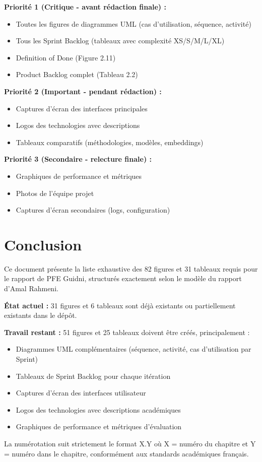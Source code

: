 \documentclass[12pt,a4paper]{article}
\begin{document}
\textbf{Priorité 1 (Critique - avant rédaction finale) :}
\begin{itemize}
    \item Toutes les figures de diagrammes UML (cas d'utilisation, séquence, activité)
    \item Tous les Sprint Backlog (tableaux avec complexité XS/S/M/L/XL)
    \item Definition of Done (Figure 2.11)
    \item Product Backlog complet (Tableau 2.2)
\end{itemize}

\textbf{Priorité 2 (Important - pendant rédaction) :}
\begin{itemize}
    \item Captures d'écran des interfaces principales
    \item Logos des technologies avec descriptions
    \item Tableaux comparatifs (méthodologies, modèles, embeddings)
\end{itemize}

\textbf{Priorité 3 (Secondaire - relecture finale) :}
\begin{itemize}
    \item Graphiques de performance et métriques
    \item Photos de l'équipe projet
    \item Captures d'écran secondaires (logs, configuration)
\end{itemize}


\section*{Conclusion}

Ce document présente la liste exhaustive des 82 figures et 31 tableaux requis pour le rapport de PFE Guidni, structurés exactement selon le modèle du rapport d'Amal Rahmeni. 

\textbf{État actuel :} 31 figures et 6 tableaux sont déjà existants ou partiellement existants dans le dépôt.

\textbf{Travail restant :} 51 figures et 25 tableaux doivent être créés, principalement :
\begin{itemize}
    \item Diagrammes UML complémentaires (séquence, activité, cas d'utilisation par Sprint)
    \item Tableaux de Sprint Backlog pour chaque itération
    \item Captures d'écran des interfaces utilisateur
    \item Logos des technologies avec descriptions académiques
    \item Graphiques de performance et métriques d'évaluation
\end{itemize}

La numérotation suit strictement le format X.Y où X = numéro du chapitre et Y = numéro dans le chapitre, conformément aux standards académiques français.
\end{document}
